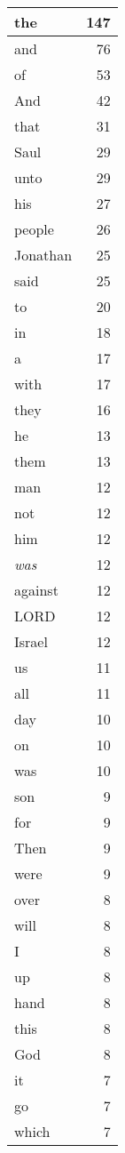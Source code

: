\begin{center}
\begin{longtable}{l|r}
\hline \hline
\endlastfoot
the & 147 \\ \hline
and & 76 \\ \hline
of & 53 \\ \hline
And & 42 \\ \hline
that & 31 \\ \hline
Saul & 29 \\ \hline
unto & 29 \\ \hline
his & 27 \\ \hline
people & 26 \\ \hline
Jonathan & 25 \\ \hline
said & 25 \\ \hline
to & 20 \\ \hline
in & 18 \\ \hline
a & 17 \\ \hline
with & 17 \\ \hline
they & 16 \\ \hline
he & 13 \\ \hline
them & 13 \\ \hline
man & 12 \\ \hline
not & 12 \\ \hline
him & 12 \\ \hline
\emph{was} & 12 \\ \hline
against & 12 \\ \hline
LORD & 12 \\ \hline
Israel & 12 \\ \hline
us & 11 \\ \hline
all & 11 \\ \hline
day & 10 \\ \hline
on & 10 \\ \hline
was & 10 \\ \hline
son & 9 \\ \hline
for & 9 \\ \hline
Then & 9 \\ \hline
were & 9 \\ \hline
over & 8 \\ \hline
will & 8 \\ \hline
I & 8 \\ \hline
up & 8 \\ \hline
hand & 8 \\ \hline
this & 8 \\ \hline
God & 8 \\ \hline
it & 7 \\ \hline
go & 7 \\ \hline
which & 7 \\ \hline

\end{longtable}
\end{center}
